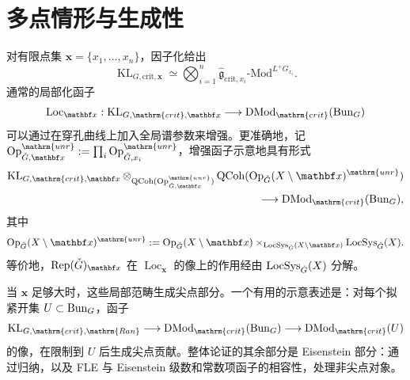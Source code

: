 \section{多点情形与生成性}\label{sec:15.6}
对有限点集 $\mathbf x=\{x_1,\ldots,x_n\}$，因子化给出
\[\operatorname{KL}_{G,\mathrm{crit},\mathbf x}\simeq\bigotimes_{i=1}^n\widehat{\mathfrak g}_{\mathrm{crit},x_i}\text{-}\mathrm{Mod}^{L^+G_{x_i}}.\]
通常的局部化函子
\[\operatorname{Loc}_{\mathbf x}:\operatorname{KL}_{G,\mathrm{crit},\mathbf x}\longrightarrow\DMod_{\mathrm{crit}}(\Bun_G)\]
可以通过在穿孔曲线上加入全局谱参数来增强。更准确地，记 $\Op^{\mathrm{unr}}_{\checkG,\mathbf x}:=\prod_i\Op^{\mathrm{unr}}_{\checkG,x_i}$，增强函子示意地具有形式
\[\begin{split}
\operatorname{KL}_{G,\mathrm{crit},\mathbf x}\otimes_{\QCoh(\Op^{\mathrm{unr}}_{\checkG,\mathbf x})}
\QCoh(\Op_{\checkG}(X\setminus\mathbf x)^{\mathrm{unr}})\\
\longrightarrow\DMod_{\mathrm{crit}}(\Bun_G),
\end{split}\]
其中
\[\Op_{\checkG}(X\setminus\mathbf x)^{\mathrm{unr}}:=\Op_{\checkG}(X\setminus\mathbf x)\times_{\LocSys_{\checkG}(X\setminus\mathbf x)}\LocSys_{\checkG}(X).\]
等价地，$\operatorname{Rep}(\checkG)_{\mathbf x}$ 在 $\operatorname{Loc}_{\mathbf x}$ 的像上的作用经由 $\operatorname{LocSys}_{\check{G}}(X)$ 分解。

当 $\mathbf x$ 足够大时，这些局部范畴生成尖点部分。一个有用的示意表述是：对每个拟紧开集 $U\subset\operatorname{Bun}_G$，函子
\[\operatorname{KL}_{G,\mathrm{crit},\mathrm{Ran}}\longrightarrow\DMod_{\mathrm{crit}}(\Bun_G)\longrightarrow\DMod_{\mathrm{crit}}(U)\]
的像，在限制到 $U$ 后生成尖点贡献。整体论证的其余部分是 Eisenstein 部分：通过归纳，以及 FLE 与 Eisenstein 级数和常数项函子的相容性，处理非尖点对象。
